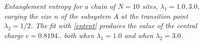 \documentclass[aps,pra,superscriptaddress]{revtex4}
\renewcommand{\(}{\left(}
\renewcommand{\)}{\right)}
\renewcommand{\[}{\left[}
\renewcommand{\]}{\right]}
\begin{document}
\begin{figure}[H]
\center
{}
\caption{{\em Entanglement entropy for a chain of $N=10$ sites, $\lambda_1=1.0,3.0$, varying the size $n$ of the subsystem $A$ at the transition point $\lambda_2 = 1/2$. The fit with \eqref{entent} produces the value of the central charge $c=0.8194..$ both when $\lambda_1=1.0$ and when $\lambda_2=3.0$. }}
\label{ee32}
\end{figure}
\end{document}
